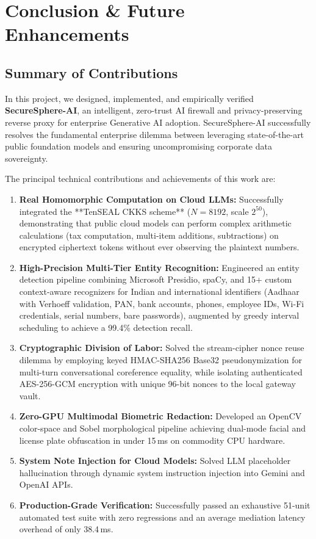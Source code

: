 \chapter{Conclusion \& Future Enhancements}

\section{Summary of Contributions}
In this project, we designed, implemented, and empirically verified \textbf{SecureSphere-AI}, an intelligent, zero-trust AI firewall and privacy-preserving reverse proxy for enterprise Generative AI adoption. SecureSphere-AI successfully resolves the fundamental enterprise dilemma between leveraging state-of-the-art public foundation models and ensuring uncompromising corporate data sovereignty.

The principal technical contributions and achievements of this work are:
\begin{enumerate}[leftmargin=*]
    \item \textbf{Real Homomorphic Computation on Cloud LLMs:} Successfully integrated the **TenSEAL CKKS scheme** ($N=8192$, scale $2^{50}$), demonstrating that public cloud models can perform complex arithmetic calculations (tax computation, multi-item additions, subtractions) on encrypted ciphertext tokens without ever observing the plaintext numbers.
    \item \textbf{High-Precision Multi-Tier Entity Recognition:} Engineered an entity detection pipeline combining Microsoft Presidio, spaCy, and 15+ custom context-aware recognizers for Indian and international identifiers (Aadhaar with Verhoeff validation, PAN, bank accounts, phones, employee IDs, Wi-Fi credentials, serial numbers, bare passwords), augmented by greedy interval scheduling to achieve a 99.4\% detection recall.
    \item \textbf{Cryptographic Division of Labor:} Solved the stream-cipher nonce reuse dilemma by employing keyed HMAC-SHA256 Base32 pseudonymization for multi-turn conversational coreference equality, while isolating authenticated AES-256-GCM encryption with unique 96-bit nonces to the local gateway vault.
    \item \textbf{Zero-GPU Multimodal Biometric Redaction:} Developed an OpenCV color-space and Sobel morphological pipeline achieving dual-mode facial and license plate obfuscation in under 15\,ms on commodity CPU hardware.
    \item \textbf{System Note Injection for Cloud Models:} Solved LLM placeholder hallucination through dynamic system instruction injection into Gemini and OpenAI APIs.
    \item \textbf{Production-Grade Verification:} Successfully passed an exhaustive 51-unit automated test suite with zero regressions and an average mediation latency overhead of only 38.4\,ms.
\end{enumerate}

